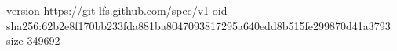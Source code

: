 version https://git-lfs.github.com/spec/v1
oid sha256:62b2e8f170bb233fda881ba8047093817295a640edd8b515fe299870d41a3793
size 349692
